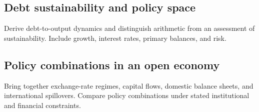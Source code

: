 \subsection{Debt sustainability and policy space}
Derive debt-to-output dynamics and distinguish arithmetic from an assessment of
sustainability. Include growth, interest rates, primary balances, and risk.

\subsection{Policy combinations in an open economy}
Bring together exchange-rate regimes, capital flows, domestic balance sheets,
and international spillovers. Compare policy combinations under stated
institutional and financial constraints.

